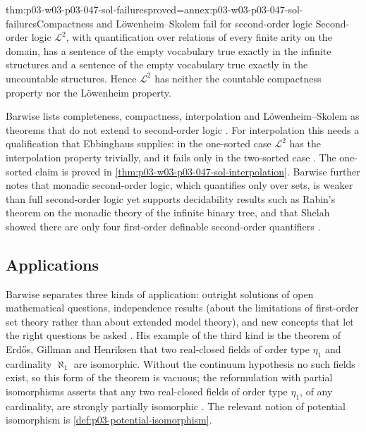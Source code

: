 \begin{hbtheorem}{thm:p03-w03-p03-047-sol-failures}{proved=annex:p03-w03-p03-047-sol-failures}{Compactness and L\"owenheim--Skolem fail for second-order logic}
Second-order logic \(\mathscr L^2\), with quantification over relations of
every finite arity on the domain, has a sentence of the empty vocabulary true
exactly in the infinite structures and a sentence of the empty vocabulary
true exactly in the uncountable structures.  Hence \(\mathscr L^2\) has
neither the countable compactness property nor the L\"owenheim property.
\end{hbtheorem}

Barwise lists completeness, compactness, interpolation and
L\"owenheim--Skolem as theorems that do not extend to second-order logic
\cite[Ch.~I, \S1.7, p.~11]{Barwise1985BackgroundAims}.  For interpolation this
needs a qualification that Ebbinghaus supplies: in the one-sorted case
\(\mathscr L^2\) has the interpolation property trivially, and it fails only
in the two-sorted case
\cite[Ch.~II, \S2.1, Warning, p.~33]{Ebbinghaus1985ExtendedLogics}.  The
one-sorted claim is proved in \cref{thm:p03-w03-p03-047-sol-interpolation}.
Barwise further notes that monadic second-order logic, which quantifies only
over sets, is weaker than full second-order logic yet supports decidability
results such as Rabin's theorem on the monadic theory of the infinite binary
tree, and that Shelah showed there are only four first-order definable
second-order quantifiers \cite[Ch.~I, \S1.7, p.~12]{Barwise1985BackgroundAims}.

\subsection{Applications}

Barwise separates three kinds of application: outright solutions of open
mathematical questions, independence results (about the limitations of
first-order set theory rather than about extended model theory), and new
concepts that let the right questions be asked
\cite[Ch.~I, \S1.8, pp.~12--13]{Barwise1985BackgroundAims}.  His example of the
third kind is the theorem of Erd\H{o}s, Gillman and Henriksen that two
real-closed fields of order type \(\eta_1\) and cardinality \(\aleph_1\) are
isomorphic.  Without the continuum hypothesis no such fields exist, so this
form of the theorem is vacuous; the reformulation with partial isomorphisms
asserts that any two real-closed fields of order type \(\eta_1\), of any
cardinality, are strongly partially isomorphic
\cite[Ch.~I, \S1.8, p.~13]{Barwise1985BackgroundAims}.  The relevant notion of
potential isomorphism is \cref{def:p03-potential-isomorphism}.

